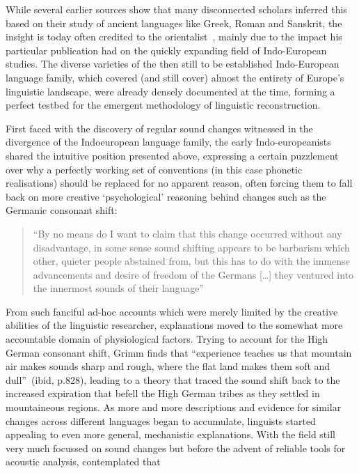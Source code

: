 While several earlier sources show that many disconnected scholars inferred this based on their study of ancient languages like Greek, Roman and Sanskrit,
the insight is today often credited to the orientalist~\citet[Sir William][]{Jones1799}, mainly due to the impact his particular publication had on the quickly expanding field of Indo-European studies. The diverse varieties of the then still to be established Indo-European language family, which covered (and still cover) almost the entirety of Europe's linguistic landscape, were already densely documented at the time, forming a perfect testbed for the emergent methodology of linguistic reconstruction.


First faced with the discovery of regular sound changes witnessed in the divergence of the Indoeuropean language family, the early Indo-europeanists shared the intuitive position presented above, expressing a certain puzzlement over why a perfectly working set of conventions (in this case phonetic realisations) should be replaced for no apparent reason, often forcing them to fall back on more creative `psychological' reasoning behind changes such as the Germanic consonant shift:

\begin{quote}
``By no means do I want to claim that this change occurred without any disadvantage, in some sense sound shifting appears to be barbarism which other, quieter people abstained from, but this has to do with the immense advancements and desire of freedom of the Germans [\ldots] they ventured into the innermost sounds of their language''~\citep[p.417, own translation]{Grimm1848}
\end{quote}

From such fanciful ad-hoc accounts which were merely limited by the creative abilities of the linguistic researcher,
explanations moved to the somewhat more accountable domain of physiological factors. Trying to account for the High German consonant shift, Grimm finds that ``experience teaches us that mountain air makes sounds sharp and rough, where the flat land makes them soft and dull''~(ibid, p.828), leading to a theory that traced the sound shift back to the increased expiration that befell the High German tribes as they settled in mountaineous regions. As more and more descriptions and evidence for similar changes across different languages began to accumulate, linguists started appealing to even more general, mechanistic explanations.
With the field still very much focussed on sound changes but before the advent of reliable tools for acoustic analysis, \citet{Jespersen1922} contemplated that

